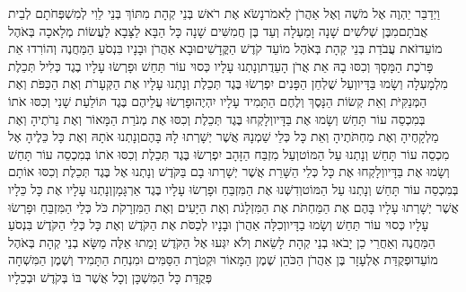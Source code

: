 \documentclass[../main/main.tex]{subfiles}
\begin{document}
\begin{multicols}{\ncols}
וַיְדַבֵּר יַהְוֶה אֶל מֹשֶׁה וְאֶל אַהֲרֹן לֵאמֹר\PreVerseSpace{}נָשֹׂא אֶת רֹאשׁ בְּנֵי קְהָת מִתּוֹךְ בְּנֵי לֵוִי לְמִשְׁפְּחֹתָם לְבֵית אֲבֹתָם\PreVerseSpace{}מִבֶּן שְׁלֹשִׁים שָׁנָה וָמַעְלָה וְעַד בֶּן חֲמִשִּׁים שָׁנָה כָּל הַבָּא\SubEnd{} לַצָּבָא לַעֲשׂוֹת מְלָאכָה בְּאֹהֶל מוֹעֵד\PreVerseSpace{}זֹאת עֲבֹדַת בְּנֵי קְהָת בְּאֹהֶל מוֹעֵד קֹדֶשׁ הַקֳּדָשִׁים\PreVerseSpace{}וּבָא אַהֲרֹן וּבָנָיו בִּנְסֹעַ הַמַּחֲנֶה וְהוֹרִדוּ אֵת פָּרֹכֶת הַמָּסָךְ וְכִסּוּ בָהּ אֵת אֲרֹן הָעֵדֻת\PreVerseSpace{}וְנָתְנוּ עָלָיו כְּסוּי עוֹר תַּחַשׁ וּפָרְשׂוּ עָלָיו\OmitEnd{} בֶגֶד כְּלִיל תְּכֵלֶת מִלְמָעְלָה וְשָׂמוּ בַּדָּיו\PreVerseSpace{}וְעַל שֻׁלְחַן הַפָּנִים יִפְרְשׂוּ בֶּגֶד תְּכֵלֶת וְנָתְנוּ עָלָיו אֶת הַקְּעָרֹת וְאֶת הַכַּפֹּת וְאֶת הַמְּנַקִּיֹּת וְאֵת קְשׂוֹת הַנָּסֶךְ וְלֶחֶם הַתָּמִיד עָלָיו יִהְיֶה\PreVerseSpace{}וּפָרְשׂוּ עֲלֵיהֶם בֶּגֶד תּוֹלַעַת שָׁנִי וְכִסּוּ אֹתוֹ בְּמִכְסֵה עוֹר תָּחַשׁ וְשָׂמוּ אֶת בַּדָּיו\PreVerseSpace{}וְלָקְחוּ בֶּגֶד תְּכֵלֶת וְכִסּוּ אֶת מְנֹרַת הַמָּאוֹר וְאֶת נֵרֹתֶיהָ וְאֶת מַלְקָחֶיהָ וְאֶת מַחְתֹּתֶיהָ וְאֵת כָּל כְּלֵי שַׁמְנָהּ אֲשֶׁר יְשָׁרְתוּ לָהּ בָּהֶם\PreVerseSpace{}וְנָתְנוּ אֹתָהּ וְאֶת כָּל כֵּלֶיהָ אֶל מִכְסֵה עוֹר תָּחַשׁ וְנָתְנוּ עַל הַמּוֹט\PreVerseSpace{}וְעַל מִזְבַּח הַזָּהָב יִפְרְשׂוּ בֶּגֶד תְּכֵלֶת וְכִסּוּ אֹתוֹ בְּמִכְסֵה עוֹר תָּחַשׁ וְשָׂמוּ אֶת בַּדָּיו\PreVerseSpace{}וְלָקְחוּ אֶת כָּל כְּלֵי הַשָּׁרֵת אֲשֶׁר יְשָׁרְתוּ בָם בַּקֹּדֶשׁ וְנָתְנוּ אֶל בֶּגֶד תְּכֵלֶת וְכִסּוּ אוֹתָם בְּמִכְסֵה עוֹר תָּחַשׁ וְנָתְנוּ עַל הַמּוֹט\PreVerseSpace{}וְדִשְּׁנוּ אֶת הַמִּזְבֵּחַ וּפָרְשׂוּ עָלָיו בֶּגֶד אַרְגָּמָן\PreVerseSpace{}וְנָתְנוּ עָלָיו אֶת כָּל כֵּלָיו אֲשֶׁר יְשָׁרְתוּ עָלָיו בָּהֶם אֶת הַמַּחְתֹּת אֶת הַמִּזְלָגֹת וְאֶת הַיָּעִים וְאֶת הַמִּזְרָקֹת כֹּל כְּלֵי הַמִּזְבֵּחַ וּפָרְשׂוּ עָלָיו כְּסוּי עוֹר תַּחַשׁ וְשָׂמוּ בַדָּיו\PreVerseSpace{}וְכִלָּה אַהֲרֹן וּבָנָיו לְכַסֹּת אֶת הַקֹּדֶשׁ וְאֶת כָּל כְּלֵי הַקֹּדֶשׁ בִּנְסֹעַ הַמַּחֲנֶה וְאַחֲרֵי כֵן יָבֹאוּ בְנֵי קְהָת לָשֵׂאת וְלֹא יִגְּעוּ אֶל הַקֹּדֶשׁ וָמֵתוּ אֵלֶּה מַשָּׂא בְנֵי קְהָת בְּאֹהֶל מוֹעֵד\PreVerseSpace{}וּפְקֻדַּת אֶלְעָזָר בֶּן אַהֲרֹן הַכֹּהֵן שֶׁמֶן הַמָּאוֹר וּקְטֹרֶת הַסַּמִּים וּמִנְחַת הַתָּמִיד וְשֶׁמֶן הַמִּשְׁחָה פְּקֻדַּת כָּל הַמִּשְׁכָּן וְכָל אֲשֶׁר בּוֹ בְּקֹדֶשׁ וּבְכֵלָיו\OpenSection{}\par

\end{multicols}
\end{document}
